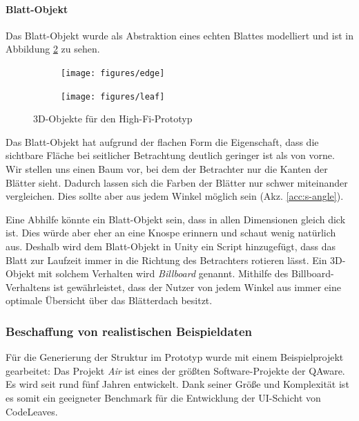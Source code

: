 \paragraph{Blatt-Objekt} Das Blatt-Objekt wurde als Abstraktion eines echten Blattes modelliert und ist in Abbildung \ref{fig:leaf} zu sehen.\\

\setlength{\fwidth}{.3\textwidth}
\begin{figure}[htb]
  \centering
  \begin{subfigure}[b]{\fwidth}
   \texttt{[image: figures/edge]}
    \label{fig:edge}
  \end{subfigure}
  \hspace{.5 cm}
  \begin{subfigure}[b]{\fwidth}
  	\texttt{[image: figures/leaf]}
  	 \label{fig:leaf}
  \end{subfigure}
  \caption{3D-Objekte für den High-Fi-Prototyp} \label{fig:3d-objects}
\end{figure}

Das Blatt-Objekt hat aufgrund der flachen Form die Eigenschaft, dass die sichtbare Fläche bei seitlicher Betrachtung deutlich geringer ist als von vorne. Wir stellen uns einen Baum vor, bei dem der Betrachter nur die Kanten der Blätter sieht. Dadurch lassen sich die Farben der Blätter nur schwer miteinander vergleichen. Dies sollte aber aus jedem Winkel möglich sein (Akz. \ref{acc:s-angle}).

Eine Abhilfe könnte ein Blatt-Objekt sein, dass in allen Dimensionen gleich dick ist. Dies würde aber eher an eine Knospe erinnern und schaut wenig natürlich aus. Deshalb wird dem Blatt-Objekt in Unity ein Script hinzugefügt, dass das Blatt zur Laufzeit immer in die Richtung des Betrachters rotieren lässt. Ein 3D-Objekt mit solchem Verhalten wird \textit{Billboard} genannt. Mithilfe des Billboard-Verhaltens ist gewährleistet, dass der Nutzer von jedem Winkel aus immer eine optimale Übersicht über das Blätterdach besitzt.

\subsubsection*{Beschaffung von realistischen Beispieldaten}
Für die Generierung der Struktur im Prototyp wurde mit einem Beispielprojekt gearbeitet: Das Projekt \textit{Air} ist eines der größten Software-Projekte der QAware. Es wird seit rund fünf Jahren entwickelt. Dank seiner Größe und Komplexität ist es somit ein geeigneter Benchmark für die Entwicklung der UI-Schicht von CodeLeaves.

